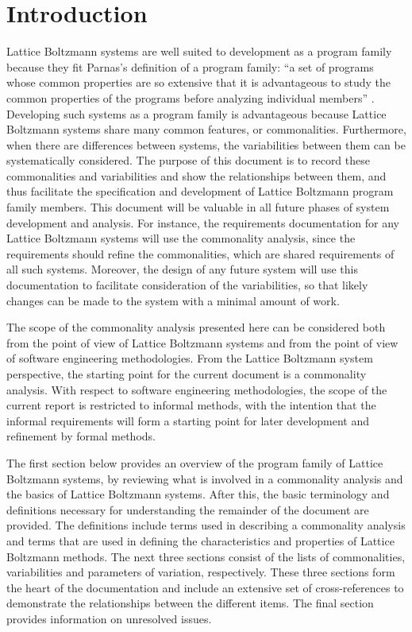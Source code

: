 \documentclass[12pt]{article}
\begin{document}
\section{Introduction}
Lattice Boltzmann systems are well suited to development as a program family because they fit Parnas’s definition of a program family: “a set of programs whose common properties are so extensive that it is advantageous to study the common properties of the programs before analyzing individual members” \citep{parnas1976design}. Developing such systems as a program family is advantageous because Lattice Boltzmann systems share many common features, or commonalities. Furthermore, when there are differences between systems, the variabilities between them can be systematically considered. The purpose of this document is to record these commonalities and variabilities and show the relationships between them, and thus facilitate the specification and development of Lattice Boltzmann program family members. This document will be valuable in all future phases of system development and analysis. For instance, the requirements documentation for any Lattice Boltzmann systems will use the commonality analysis, since the requirements should refine the commonalities, which are shared requirements of all such systems. Moreover, the design of any future system will use this documentation to facilitate consideration of the variabilities, so that likely changes can be made to the system with a minimal amount of work.

The scope of the commonality analysis presented here can be considered both from the point of view of Lattice Boltzmann systems and from the point of view of software engineering methodologies. From the Lattice Boltzmann system perspective, the starting point for the current document is a commonality analysis. With respect to software engineering methodologies, the scope of the current report is restricted to informal methods, with the intention that the informal requirements will form a starting point for later development and refinement by formal methods.

The first section below provides an overview of the program family of Lattice Boltzmann systems, by reviewing what is involved in a commonality analysis and the basics of Lattice Boltzmann systems. After this, the basic terminology and definitions necessary for understanding the remainder of the document are provided. The definitions include terms used in describing a commonality analysis and terms that are used in defining the characteristics and properties of Lattice Boltzmann methods. The next three sections consist of the lists of commonalities, variabilities and parameters of variation, respectively. These three sections form the heart of the documentation and include an extensive set of cross-references to demonstrate the relationships between the different items. The final section provides information on unresolved issues.
\end{document}
